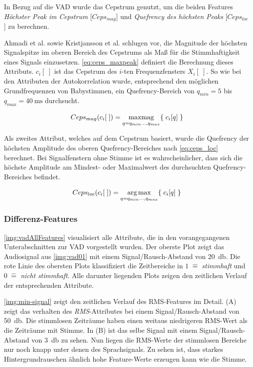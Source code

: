 In Bezug auf die VAD wurde das Cepstrum genutzt, um die beiden Features \emph{Höchster Peak im Cepstrum} [$Ceps_{mag}$] und \emph{Quefrency des höchsten Peaks} [$Ceps_{loc}$] zu berechnen.

Ahmadi et al. \cite{vad_ceps} sowie Kristjansson et al. \cite{vad_Lisboa} schlugen vor, die Magnitude der höchsten Signalspitze im oberen Bereich des Cepstrums als Maß für die Stimmhaftigkeit eines Signals einzusetzen. \autoref{eq:ceps_maxpeak} definiert die Berechnung dieses Attributs. $c_i[\;]$ ist das Cepstrum des $i$-ten Frequenzfensters $X_i[\;]$. So wie bei den Attributen der Autokorrelation wurde, entsprechend den möglichen Grundfrequenzen von Babystimmen, ein Quefrency-Bereich von $q_{min} = 5$ bis $q_{max} = \SI{40}{\milli\second}$ durchsucht.

\begin{equation}
Ceps_{mag}(c_i[\;]) = \operatorname*{max mag}_{q = q_{min} \ldots , q_{max}}\{ \; c_i[q] \; \}
\label{eq:ceps_maxpeak}
\end{equation}

Als zweites Attribut, welches auf dem Cepstrum basiert, wurde die Quefrency der höchsten Amplitude des oberen Quefrency-Bereiches nach \autoref{eq:ceps_loc} berechnet. Bei Signalfenstern ohne Stimme ist es wahrscheinlicher, dass sich die höchste Amplitude am Mindest- oder Maximalwert des durchsuchten Quefrency-Bereiches befindet.

\begin{equation}
Ceps_{loc}(c_i[\;]) = \operatorname*{arg\,max}_{q = q_{min} \ldots , q_{max}} \{ \; c_i[q] \; \}
\label{eq:ceps_loc}
\end{equation}	

\subsubsection{Differenz-Features}
\label{sec:vad_dif_feature}

\autoref{img:vadAllFeatures} visualisiert alle Attribute, die in den vorangegangenen Unterabschnitten zur VAD vorgestellt wurden. Der oberste Plot zeigt das Audiosignal aus \autoref{img:vad01} mit einem Signal/Rausch-Abstand von \SI{20}{\decibel}. Die rote Linie des obersten Plots klassifiziert die Zeitbereiche in $1 \; \hat{=} $ \emph{stimmhaft} und $0 \; \hat{=}$ \emph{nicht stimmhaft}. Alle darunter liegenden Plots zeigen den zeitlichen Verlauf der entsprechenden Attribute.

\autoref{img:min-signal} zeigt den zeitlichen Verlauf des RMS-Features im Detail. (A) zeigt das verhalten des \emph{RMS}-Attributes bei einem Signal/Rausch-Abstand von \SI{50}{\decibel}. Die stimmlosen Zeiträume haben einen weitaus niedrigeren RMS-Wert als die Zeiträume mit Stimme. In (B) ist das selbe Signal mit einem Signal/Rausch-Abstand von \SI{3}{\decibel} zu sehen. Nun liegen die RMS-Werte der stimmlosen Bereiche nur noch knapp unter denen des Sprachsignals. Zu sehen ist, dass starkes Hintergrundrauschen ähnlich hohe Feature-Werte erzeugen kann wie die Stimme.

